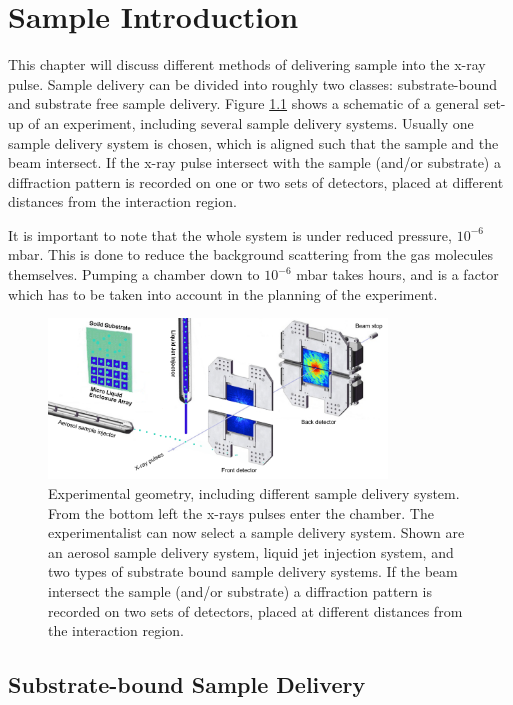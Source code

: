 \chapter{Sample Introduction}
This chapter will discuss different methods of delivering sample into the x-ray pulse. Sample delivery can be divided into roughly two classes: substrate-bound and substrate free sample delivery. Figure \ref{fig:experimental_geometry} shows a schematic of a general set-up of an experiment, including several sample delivery systems. Usually one sample delivery system is chosen, which is aligned such that the sample and the beam intersect. If the x-ray pulse intersect with the sample (and/or substrate) a diffraction pattern is recorded on one or two sets of detectors, placed at different distances from the interaction region.

It is important to note that the whole system is under reduced pressure, $10^{-6}$ mbar. This is done to reduce the background scattering from the gas molecules themselves. Pumping a chamber down to $10^{-6}$ mbar takes hours, and is a factor which has to be taken into account in the planning of the experiment. 

\begin{figure}[h]\label{fig:experimental_geometry}
\centering 
\includegraphics[width=90mm]{Chapter_04_ExperimentalGeometry.png}
\caption{Experimental geometry, including different sample delivery system. From the bottom left the x-rays pulses enter the chamber. The experimentalist can now select a sample delivery system. Shown are an aerosol sample delivery system, liquid jet injection system, and two types of substrate bound sample delivery systems. If the beam intersect the sample (and/or substrate) a diffraction pattern is recorded on two sets of detectors, placed at different distances from the interaction region.}
\end{figure}

\section{Substrate-bound Sample Delivery}
